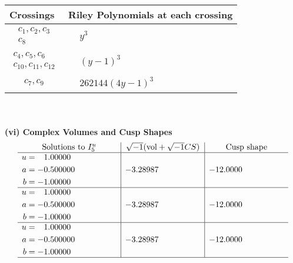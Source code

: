 \documentclass[1p]{elsarticle_modified}
\theoremstyle{definition}
\newcommand{\I}{\sqrt{-1}}
\begin{document}
\begin{tabular}{m{50pt}|m{274pt}}
Crossings & \hspace{64pt}Riley Polynomials at each crossing \\
\hline $$\begin{aligned}c_{1},c_{2},c_{3}\\c_{8}\end{aligned}$$&$\begin{aligned}
&y^3
\end{aligned}$\\
\hline $$\begin{aligned}c_{4},c_{5},c_{6}\\c_{10},c_{11},c_{12}\end{aligned}$$&$\begin{aligned}
&(y-1)^3
\end{aligned}$\\
\hline $$\begin{aligned}c_{7},c_{9}\end{aligned}$$&$\begin{aligned}
&262144(4 y-1)^3
\end{aligned}$\\
\hline
\end{tabular}\\~\\
\newpage\flushleft \textbf{(vi) Complex Volumes and Cusp Shapes}
$$\begin{array}{c|c|c}  
\text{Solutions to }I^u_{5}& \I (\text{vol} + \sqrt{-1}CS) & \text{Cusp shape}\\
 \hline 
\begin{aligned}
u &= \phantom{-}1.00000\phantom{ +0.000000I} \\
a &= -0.500000\phantom{ +0.000000I} \\
b &= -1.00000\phantom{ +0.000000I}\end{aligned}
 & -3.28987\phantom{ +0.000000I} & -12.0000\phantom{ +0.000000I} \\ \hline\begin{aligned}
u &= \phantom{-}1.00000\phantom{ +0.000000I} \\
a &= -0.500000\phantom{ +0.000000I} \\
b &= -1.00000\phantom{ +0.000000I}\end{aligned}
 & -3.28987\phantom{ +0.000000I} & -12.0000\phantom{ +0.000000I} \\ \hline\begin{aligned}
u &= \phantom{-}1.00000\phantom{ +0.000000I} \\
a &= -0.500000\phantom{ +0.000000I} \\
b &= -1.00000\phantom{ +0.000000I}\end{aligned}
 & -3.28987\phantom{ +0.000000I} & -12.0000\phantom{ +0.000000I}\\
 \hline 
 \end{array}$$\newpage
\end{document}

